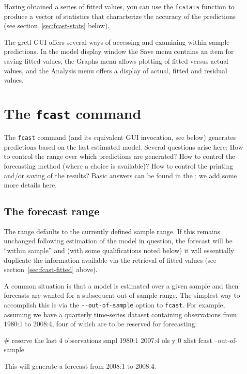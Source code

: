Having obtained a series of fitted values, you can use the
\texttt{fcstats} function to produce a vector of statistics that
characterize the accuracy of the predictions (see
section~\ref{sec:fcast-stats} below).

The gretl GUI offers several ways of accessing and examining
within-sample predictions.  In the model display window the
\textsf{Save} menu contains an item for saving fitted values, the
\textsf{Graphs} menu allows plotting of fitted versus actual values,
and the \textsf{Analysis} menu offers a display of actual, fitted and
residual values.


\section{The \texttt{fcast} command}
\label{sec:fcast-fcast}

The \texttt{fcast} command (and its equivalent GUI invocation, see 
below) generates predictions based on the last
estimated model.  Several questions arise here: How to control the
range over which predictions are generated?  How to control the
forecasting method (where a choice is available)?  How to control the
printing and/or saving of the results?  Basic answers can be found in
the \GCR; we add some more details here.

\subsection{The forecast range}

The range defaults to the currently defined sample range.  If this
remains unchanged following estimation of the model in question, the
forecast will be ``within sample'' and (with some qualifications noted
below) it will essentially duplicate the information available via the
retrieval of fitted values (see section~\ref{sec:fcast-fitted} above).

A common situation is that a model is estimated over a given sample
and then forecasts are wanted for a subsequent out-of-sample range.  The
simplest way to accomplish this is via the \verb|--out-of-sample|
option to \texttt{fcast}.  For example, assuming we have a quarterly
time-series dataset containing observations from 1980:1 to 2008:4,
four of which are to be reserved for forecasting:
%
\begin{code}
# reserve the last 4 observations
smpl 1980:1 2007:4
ols y 0 xlist
fcast --out-of-sample
\end{code}
%
This will generate a forecast from 2008:1 to 2008:4.

